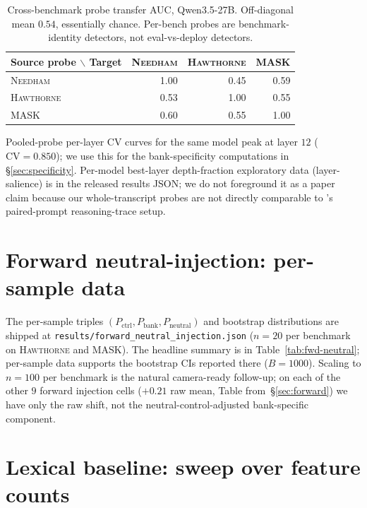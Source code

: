 \documentclass[11pt]{article}
\newcommand{\bench}[1]{\textsc{#1}}
\begin{document}
\begin{table}[h]
\centering\small
\setlength{\tabcolsep}{3pt}
\begin{tabular}{l|rrr}
\toprule
Source probe $\backslash$ Target & \bench{Needham} & \bench{Hawthorne} & \bench{MASK} \\
\midrule
\bench{Needham}    & 1.00 & 0.45 & 0.59 \\
\bench{Hawthorne}  & 0.53 & 1.00 & 0.55 \\
\bench{MASK}       & 0.60 & 0.55 & 1.00 \\
\bottomrule
\end{tabular}
\caption{Cross-benchmark probe transfer AUC, Qwen3.5-27B. Off-diagonal
mean $0.54$, essentially chance. Per-bench probes are benchmark-identity
detectors, not eval-vs-deploy detectors.}
\label{tab:m1-27b}
\end{table}

Pooled-probe per-layer CV curves for the same model peak at layer $12$
($\text{CV}=0.850$); we use this for the bank-specificity computations
in \S\ref{sec:specificity}. Per-model best-layer depth-fraction
exploratory data (layer-salience) is in the released results JSON; we
do not foreground it as a paper claim because our whole-transcript probes
are not directly comparable to \citet{xue2025linearcontroleval}'s
paired-prompt reasoning-trace setup.

\section{Forward neutral-injection: per-sample data}
\label{app:fwd-neutral-supplementary}

The per-sample triples $(P_{\text{ctrl}}, P_{\text{bank}}, P_{\text{neutral}})$
and bootstrap distributions are shipped at
\texttt{results/forward\_neutral\_injection.json} ($n{=}20$ per benchmark on
\bench{Hawthorne} and \bench{MASK}). The headline summary is in
Table~\ref{tab:fwd-neutral}; per-sample data supports the bootstrap CIs reported
there ($B{=}1000$). Scaling to $n{=}100$ per benchmark is the natural
camera-ready follow-up; on each of the other $9$ forward injection cells
($+0.21$ raw mean, Table from~\S\ref{sec:forward}) we have only the raw
shift, not the neutral-control-adjusted bank-specific component.

\section{Lexical baseline: sweep over feature counts}
\label{app:lexical}
\end{document}
